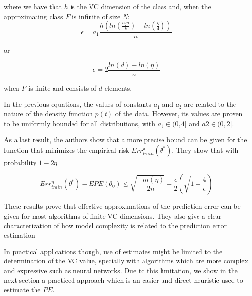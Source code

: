 where we have that $h$ is the VC dimension of the class and, when the approximating class $F$ is infinite of size $N$: 
\begin{equation}\label{vapnik-epsilonBound}
\epsilon = a_1 \frac{h \left( ln(\frac{a_2 n}{h} ) -  ln(\frac{\eta}{4} ) \right)}{n}
\end{equation}

or 

\begin{equation}\label{vapnik-epsilonBound}
\epsilon = 2 \frac{ ln(d) - ln(\eta)}{n}
\end{equation}

when $F$ is finite and consists of $d$ elements.

In the previous equations, the values of constants $a_1$ and $a_2$ are related to the nature of the density function $p(t)$ of the data. However, its values are proven to be uniformly bounded for all distributions, with $a_1 \in (0,4 ]$ and $a2 \in (0,2 ]$. 

As a last result, the authors show that a more precise bound can be given for the function that minimizes the empirical risk $Err^n_{train}(\theta^*)$. They show that with probability $1 - 2\eta$ 

\begin{equation}\label{vapnik-classificationBoundPrecise}
Err^n_{train}(\theta^*) - EPE(\theta_0) \leq  \sqrt{\frac{-ln(\eta)}{2n} } + \frac{\epsilon}{2}\left( \sqrt{1 + \frac{4}{\epsilon} } \right)
\end{equation}

These results prove that effective approximations of the prediction error can be given for most algorithms of finite VC dimensions. They also give a clear characterization of how model complexity is related to the prediction error estimation. 

In practical applications though, use of estimates might be limited to the determination of the VC value, specially with algorithms which are more complex and expressive such as neural networks. Due to this limitation, we show in the next section a practiced approach which is an easier and direct heuristic used to estimate the $PE$.
